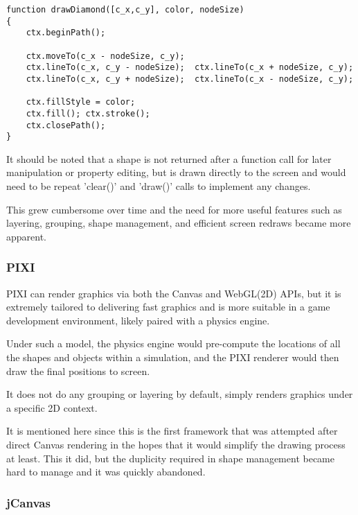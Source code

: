 \begingroup
\begin{spacing}{1}
\begin{lstlisting}[label=code:canvasapi]
function drawDiamond([c_x,c_y], color, nodeSize)
{
    ctx.beginPath();

    ctx.moveTo(c_x - nodeSize, c_y); 
    ctx.lineTo(c_x, c_y - nodeSize);  ctx.lineTo(c_x + nodeSize, c_y); 
    ctx.lineTo(c_x, c_y + nodeSize);  ctx.lineTo(c_x - nodeSize, c_y);
    
    ctx.fillStyle = color; 
    ctx.fill(); ctx.stroke();
    ctx.closePath();
}
\end{lstlisting}
\vspace{-10pt}
\end{spacing}
\endgroup

It should be noted that a shape is not returned after a function call for later manipulation or property editing, but is drawn directly to the screen and would need to be repeat 'clear()' and 'draw()' calls to implement any changes.

This grew cumbersome over time and the need for more useful features such as layering, grouping, shape management, and efficient screen redraws became more apparent. 

\subsubsection{PIXI}

PIXI can render graphics via both the Canvas and WebGL(2D) APIs, but it is extremely tailored to delivering fast graphics and is more suitable in a game development environment, likely paired with a physics engine.\citep{pixi}

Under such a model, the physics engine would pre-compute the locations of all the shapes and objects within a simulation, and the PIXI renderer would then draw the final positions to screen. 

It does not do any grouping or layering  by default, simply renders graphics under a specific 2D context. 

It is mentioned here since this is the first framework that was attempted after direct Canvas rendering in the hopes that it would simplify the drawing process at least. This it did, but the duplicity required in shape management became hard to manage and it was quickly abandoned.


\subsubsection{jCanvas}

